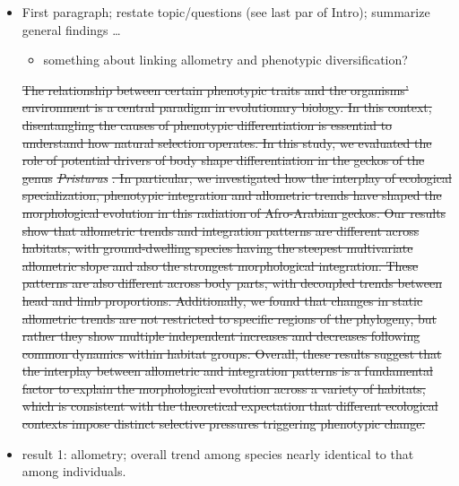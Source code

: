 \documentclass[
  11pt,
]{article}
\providecommand{\tightlist}{%
  \setlength{\itemsep}{0pt}\setlength{\parskip}{0pt}}
\providecommand{\DIFdeltex}[1]{{\protect\color{red}\sout{#1}}}                      %
\providecommand{\DIFdelbegin}{} %
\providecommand{\DIFdelend}{} %
\providecommand{\DIFdel}[1]{\texorpdfstring{\DIFdeltex{#1}}{}} %
\newcommand{\DIFscaledelfig}{0.5}
\newlength{\DIFdelgraphicswidth} %
\newlength{\DIFdelgraphicsheight} %
\newcommand{\DIFdelincludegraphics}[2][]{%
\sbox{\DIFdelgraphicsbox}{\DIFOincludegraphics[#1]{#2}}%
\settoboxwidth{\DIFdelgraphicswidth}{\DIFdelgraphicsbox} %
\settoboxtotalheight{\DIFdelgraphicsheight}{\DIFdelgraphicsbox} %
\scalebox{\DIFscaledelfig}{%
\parbox[b]{\DIFdelgraphicswidth}{\usebox{\DIFdelgraphicsbox}\\[-\baselineskip] \rule{\DIFdelgraphicswidth}{0em}}\llap{\resizebox{\DIFdelgraphicswidth}{\DIFdelgraphicsheight}{%
\setlength{\unitlength}{\DIFdelgraphicswidth}%
\begin{picture}(1,1)%
\thicklines\linethickness{2pt} %
{\color[rgb]{1,0,0}\put(0,0){\framebox(1,1){}}}%
{\color[rgb]{1,0,0}\put(0,0){\line( 1,1){1}}}%
{\color[rgb]{1,0,0}\put(0,1){\line(1,-1){1}}}%
\end{picture}%
}\hspace*{3pt}}} %
} %
\DeclareRobustCommand{\DIFdelbegin}{\DIFOdelbegin \let\includegraphics\DIFdelincludegraphics} %
\DeclareRobustCommand{\DIFdelend}{\DIFOaddend \let\includegraphics\DIFOincludegraphics} %
\begin{document}
\begin{itemize}
\DIFdelbegin %
\DIFdelend \item
  First paragraph; restate topic/questions (see last par of Intro);
  summarize general findings \ldots{}

  \begin{itemize}
  \tightlist
  \item
    something about linking allometry and phenotypic diversification?
  \end{itemize}
\DIFdelbegin %

\DIFdel{The relationship between certain phenotypic traits and the organisms'
environment is a central paradigm in evolutionary biology. In this
context, disentangling the causes of phenotypic differentiation is
essential to understand how natural selection operates. In this study,
we evaluated the role of potential drivers of body shape differentiation
in the geckos of the genus }\emph{\DIFdel{Pristurus}}%
\DIFdel{. In particular, we
investigated how the interplay of ecological specialization, phenotypic
integration and allometric trends have shaped the morphological
evolution in this radiation of Afro-Arabian geckos. Our results show
that allometric trends and integration patterns are different across
habitats, with ground-dwelling species having the steepest multivariate
allometric slope and also the strongest morphological integration. These
patterns are also different across body parts, with decoupled trends
between head and limb proportions. Additionally, we found that changes
in static allometric trends are not restricted to specific regions of
the phylogeny, but rather they show multiple independent increases and
decreases following common dynamics within habitat groups. Overall,
these results suggest that the interplay between allometric and
integration patterns is a fundamental factor to explain the
morphological evolution across a variety of habitats, which is
consistent with the theoretical expectation that different ecological
contexts impose distinct selective pressures triggering phenotypic
change.
}%

\DIFdelend \item
  result 1: allometry; overall trend among species nearly identical to
  that among individuals. \DIFdelbegin %


\end{itemize}
\end{document}
